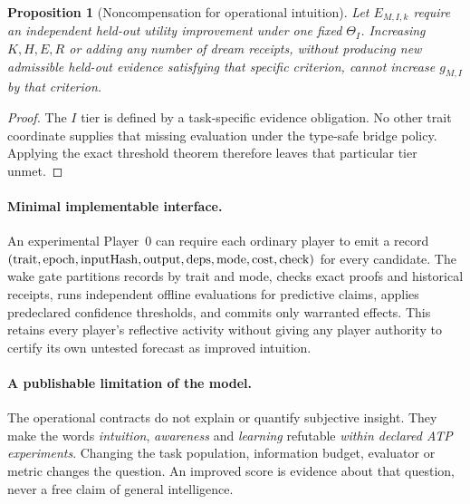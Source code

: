 \documentclass[11pt,letterpaper]{article}
\theoremstyle{definition}
\theoremstyle{plain}
\newtheorem{proposition}[definition]{Proposition}
\theoremstyle{definition}
\begin{document}
\begin{proposition}[Noncompensation for operational intuition]
Let $E_{M,I,k}$ require an independent held-out utility improvement under
one fixed $\Theta_I$. Increasing $K,H,E,R$ or adding any number of dream
receipts, without producing new admissible held-out evidence satisfying
that specific criterion, cannot increase $g_{M,I}$ by that criterion.
\end{proposition}
\begin{proof}
The $I$ tier is defined by a task-specific evidence obligation. No other
trait coordinate supplies that missing evaluation under the type-safe
bridge policy. Applying the exact threshold theorem therefore leaves
that particular tier unmet.\end{proof}

\paragraph{Minimal implementable interface.}
An experimental Player~0 can require each ordinary player to emit a record
$({\rm trait},{\rm epoch},{\rm inputHash},{\rm output},
 {\rm deps},{\rm mode},{\rm cost},{\rm check})$ for every candidate.
The wake gate partitions records by trait and mode, checks exact proofs and
historical receipts, runs independent offline evaluations for predictive
claims, applies predeclared confidence thresholds, and commits only
warranted effects. This retains every player's reflective activity
without giving any player authority to certify its own untested
forecast as improved intuition.

\paragraph{A publishable limitation of the model.}
The operational contracts do not explain or quantify subjective insight.
They make the words \emph{intuition}, \emph{awareness} and \emph{learning}
refutable \emph{within declared ATP experiments}. Changing the task
population, information budget, evaluator or metric changes the question.
An improved score is evidence about that question, never a free claim of
general intelligence.
\end{document}

